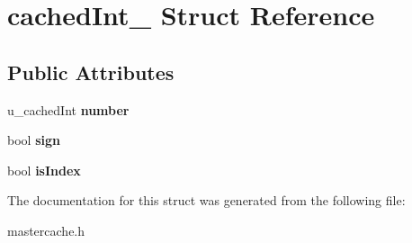 \hypertarget{structcachedInt__}{}\section{cached\+Int\+\_\+ Struct Reference}
\label{structcachedInt__}
\subsection*{Public Attributes}
\begin{DoxyCompactItemize}
\item 
u\+\_\+cached\+Int {\bfseries number}\hypertarget{structcachedInt___ad5712d34d8cd30f2e4c00c08f2fab98c}{}\label{structcachedInt___ad5712d34d8cd30f2e4c00c08f2fab98c}

\item 
bool {\bfseries sign}\hypertarget{structcachedInt___a44a31e98d31635467c3a92a1562f62d9}{}\label{structcachedInt___a44a31e98d31635467c3a92a1562f62d9}

\item 
bool {\bfseries is\+Index}\hypertarget{structcachedInt___a3604444ad7f8c738b04ec6317b45d501}{}\label{structcachedInt___a3604444ad7f8c738b04ec6317b45d501}

\end{DoxyCompactItemize}


The documentation for this struct was generated from the following file\+:\begin{DoxyCompactItemize}
\item 
mastercache.\+h\end{DoxyCompactItemize}
